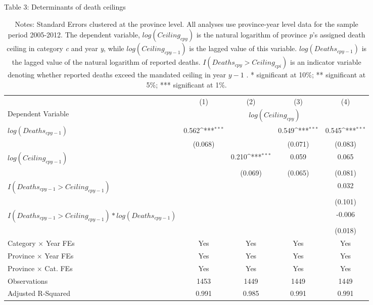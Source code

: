 \begin{table}[htbp]\centering\captionsetup{width=0.8\textwidth}\footnotesize{
\def\sym#1{\ifmmode^{#1}\else\(^{#1}\)\fi}
\caption{Table 3: Determinants of death ceilings}
\begin{tabular}{l*{4}{c}}
\hline\hline
                    &\multicolumn{1}{c}{(1)}         &\multicolumn{1}{c}{(2)}         &\multicolumn{1}{c}{(3)}         &\multicolumn{1}{c}{(4)}         \\
Dependent Variable & \multicolumn{4}{c}{ $ log(Ceiling_{cpy}) $ }  \\
\hline
 $ log(Deaths_{cpy-1}) $ &       0.562\sym{***}&                     &       0.549\sym{***}&       0.545\sym{***}\\
                    &     (0.068)         &                     &     (0.071)         &     (0.083)         \\
 $ log(Ceiling_{cpy-1}) $ &                     &       0.210\sym{***}&       0.059         &       0.065         \\
                    &                     &     (0.069)         &     (0.065)         &     (0.081)         \\
 $ I(Deaths_{cpy-1}>Ceiling_{cpy-1}) $ &                     &                     &                     &       0.032         \\
                    &                     &                     &                     &     (0.101)         \\
 $ I(Deaths_{cpy-1}>Ceiling_{cpy-1}) * log(Deaths_{cpy-1}) $ &                     &                     &                     &      -0.006         \\
                    &                     &                     &                     &     (0.018)         \\
\hline
Category $ \times $ Year FEs     & Yes & Yes & Yes & Yes \\
Province $ \times $ Year FEs     & Yes & Yes & Yes & Yes \\
Province $ \times $ Cat. FEs & Yes & Yes & Yes & Yes \\
\hline
Observations        &        1453         &        1449         &        1449         &        1449         \\
Adjusted R-Squared  &       0.991         &       0.985         &       0.991         &       0.991         \\
\hline\hline
\end{tabular}}
\caption{Notes: Standard Errors clustered at the province level. All analyses use province-year level data for the sample period 2005-2012. The dependent variable, $ log(Ceiling_{cpy}) $ is the natural logarithm of province \emph{p}'s assigned death ceiling in category \emph{c} and year \emph{y}, while $ log(Ceiling_{cpy-1}) $ is the lagged value of this variable.  $ log(Deaths_{cpy-1} )$ is the lagged value of the natural logarithm of reported deaths. $ I(Deaths_{cpy} > Ceiling_{cpi}) $ is an indicator variable denoting whether reported deaths exceed the mandated ceiling in year $ y-1 $ .  * significant at 10\%; ** significant at 5\%; *** significant at 1\%. }
\end{table}

